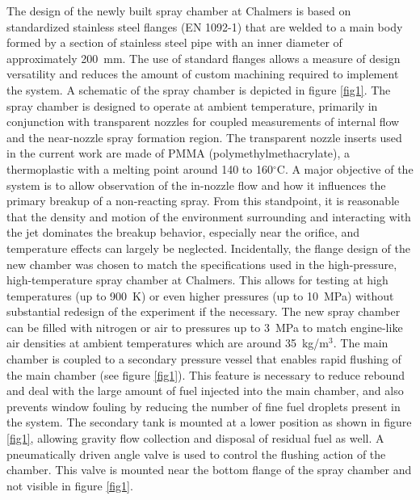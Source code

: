 \documentclass[letterpaper,twocolumn,10pt]{ilass}
\begin{document}
%
The design of the newly built spray chamber at Chalmers is based on standardized stainless
steel flanges (EN 1092-1) that are welded to a main body formed by a section of
stainless steel pipe with an inner diameter of approximately 200~mm.
%
The use of standard flanges allows a measure of design versatility and reduces the amount of custom machining required to implement the system.
A schematic of the spray chamber is depicted in figure \ref{fig1}.
%
The spray chamber is designed to operate at ambient temperature, primarily in conjunction
with transparent nozzles for coupled measurements of internal flow and the near-nozzle
spray formation region.
%
The transparent nozzle inserts used in the current work are made of PMMA (polymethylmethacrylate), a thermoplastic with a melting point around 140 to 160$^{\circ}$C.
%
A major objective of the system is to allow observation of the in-nozzle flow and how it
influences the primary breakup of a non-reacting spray. From this standpoint, it is reasonable
that the density and motion of the environment surrounding and interacting with the jet
dominates the breakup behavior, especially near the orifice, and temperature effects can largely be neglected.
%
Incidentally, the flange design of the new chamber was chosen to match the specifications
used in the high-pressure, high-temperature spray chamber at Chalmers. This allows for
testing at high temperatures (up to 900~K) or even higher pressures (up to 10~MPa)
without substantial redesign of the experiment if the necessary.
%
The new spray chamber can be filled with nitrogen or air to pressures up to 3~MPa to
match engine-like air densities at ambient temperatures which are around 35~kg/m$^3$.
The main chamber is coupled to a secondary pressure vessel that enables rapid flushing
of the main chamber (see figure \ref{fig1}).
This feature is necessary to reduce rebound and deal with the large amount of fuel
injected into the main chamber, and also prevents window fouling by reducing the number of fine fuel droplets present in the system.
The secondary tank is mounted at a lower position as shown in figure \ref{fig1},
allowing gravity flow collection and disposal of residual fuel as well.
A pneumatically driven angle valve is used to control the flushing action of the chamber.
This valve is mounted near the bottom flange of the spray chamber and not visible in figure \ref{fig1}. 
\end{document}
